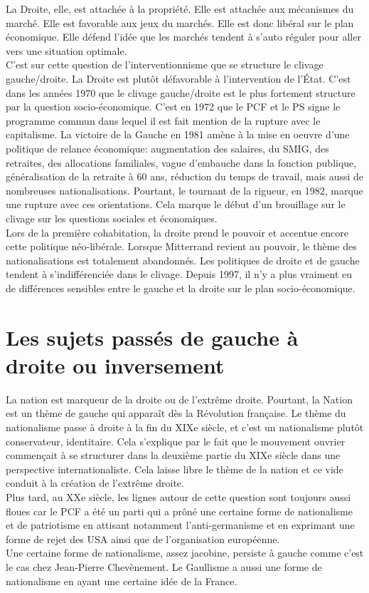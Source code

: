 \documentclass[10pt, a4paper, openany]{book}
\begin{document}
La Droite, elle, est attachée à la propriété. Elle est attachée aux mécanismes du marché. Elle est favorable aux jeux du marchés. Elle est donc libéral sur le plan économique. Elle défend l'idée que les marchés tendent à s'auto réguler pour aller vers une situation optimale. \\
C'est sur cette question de l'interventionnisme que se structure le clivage gauche/droite. La Droite est plutôt défavorable à l'intervention de l'État. C'est dans les années 1970 que le clivage gauche/droite est le plus fortement structure par la question socio-économique. C'est en 1972 que le PCF et le PS signe le programme commun dans lequel il est fait mention de la rupture avec le capitalisme. La victoire de la Gauche en 1981 amène à la mise en oeuvre d'une politique de relance économique: augmentation des salaires, du SMIG, des retraites, des allocations familiales, vague d'embauche dans la fonction publique, généralisation de la retraite à 60 ans, réduction du temps de travail, mais aussi de nombreuses nationalisations. Pourtant, le tournant de la rigueur, en 1982, marque une rupture avec ces orientations. Cela marque le début d'un brouillage sur le clivage sur les questions sociales et économiques. \\
Lors de la première cohabitation, la droite prend le pouvoir et accentue encore cette politique néo-libérale. Lorsque Mitterrand revient au pouvoir, le thème des nationalisations est totalement abandonnés. Les politiques de droite et de gauche tendent à s'indifférenciée dans le clivage. Depuis 1997, il n'y a plus vraiment eu de différences sensibles entre le gauche et la droite sur le plan socio-économique.


\section{Les sujets passés de gauche à droite ou inversement} 

La nation est marqueur de la droite ou de l'extrême droite. Pourtant, la Nation est un thème de gauche qui apparaît dès la Révolution française. Le thème du nationalisme passe à droite à la fin du XIXe siècle, et c'est un nationalisme plutôt conservateur, identitaire. Cela s'explique par le fait que le mouvement ouvrier commençait à se structurer dans la deuxième partie du XIXe siècle dans une perspective internationaliste. Cela laisse libre le thème de la nation et ce vide conduit à la création de l'extrême droite. \\
Plus tard, au XXe siècle, les lignes autour de cette question sont toujours aussi floues car le PCF a été un parti qui a prôné une certaine forme de nationalisme et de patriotisme en attisant notamment l'anti-germanisme et en exprimant une forme de rejet des USA ainsi que de l'organisation européenne. \\
Une certaine forme de nationalisme, assez jacobine, persiste à gauche comme c'est le cas chez Jean-Pierre Chevènement. Le Gaullisme a aussi une forme de nationalisme en ayant une certaine idée de la France. 
\end{document}
